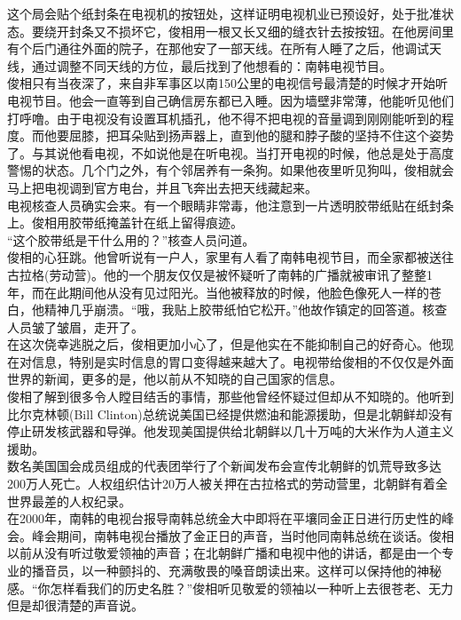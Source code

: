 这个局会贴个纸封条在电视机的按钮处，这样证明电视机业已预设好，处于批准状态。要绕开封条又不损坏它，俊相用一根又长又细的缝衣针去按按钮。在他房间里有个后门通往外面的院子，在那他安了一部天线。在所有人睡了之后，他调试天线，通过调整不同天线的方位，最后找到了他想看的：南韩电视节目。\\

俊相只有当夜深了，来自非军事区以南150公里的电视信号最清楚的时候才开始听电视节目。他会一直等到自己确信房东都已入睡。因为墙壁非常薄，他能听见他们打呼噜。由于电视没有设置耳机插孔，他不得不把电视的音量调到刚刚能听到的程度。而他要屈膝，把耳朵贴到扬声器上，直到他的腿和脖子酸的坚持不住这个姿势了。与其说他看电视，不如说他是在听电视。当打开电视的时候，他总是处于高度警惕的状态。几个门之外，有个邻居养有一条狗。如果他夜里听见狗叫，俊相就会马上把电视调到官方电台，并且飞奔出去把天线藏起来。\\

电视核查人员确实会来。有一个眼睛非常毒，他注意到一片透明胶带纸贴在纸封条上。俊相用胶带纸掩盖针在纸上留得痕迹。\\

“这个胶带纸是干什么用的？”核查人员问道。\\

俊相的心狂跳。他曾听说有一户人，家里有人看了南韩电视节目，而全家都被送往古拉格(劳动营)。他的一个朋友仅仅是被怀疑听了南韩的广播就被审讯了整整1年，而在此期间他从没有见过阳光。当他被释放的时候，他脸色像死人一样的苍白，他精神几乎崩溃。“哦，我贴上胶带纸怕它松开。”他故作镇定的回答道。核查人员皱了皱眉，走开了。\\

在这次侥幸逃脱之后，俊相更加小心了，但是他实在不能抑制自己的好奇心。他现在对信息，特别是实时信息的胃口变得越来越大了。电视带给俊相的不仅仅是外面世界的新闻，更多的是，他以前从不知晓的自己国家的信息。\\

俊相了解到很多令人瞠目结舌的事情，那些他曾经怀疑过但却从不知晓的。他听到比尔克林顿(Bill Clinton)总统说美国已经提供燃油和能源援助，但是北朝鲜却没有停止研发核武器和导弹。他发现美国提供给北朝鲜以几十万吨的大米作为人道主义援助。\\

数名美国国会成员组成的代表团举行了个新闻发布会宣传北朝鲜的饥荒导致多达200万人死亡。人权组织估计20万人被关押在古拉格式的劳动营里，北朝鲜有着全世界最差的人权纪录。\\

在2000年，南韩的电视台报导南韩总统金大中即将在平壤同金正日进行历史性的峰会。峰会期间，南韩电视台播放了金正日的声音，当时他同南韩总统在谈话。俊相以前从没有听过敬爱领袖的声音；在北朝鲜广播和电视中他的讲话，都是由一个专业的播音员，以一种颤抖的、充满敬畏的嗓音朗读出来。这样可以保持他的神秘感。“你怎样看我们的历史名胜？”俊相听见敬爱的领袖以一种听上去很苍老、无力但是却很清楚的声音说。\\

